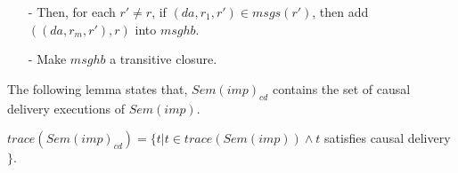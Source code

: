 \begin {itemize}
\begin{itemize}
\begin{itemize}
        \item[-] Then, for each $r' \neq r$, if $(\mathit{da},r_1,r') \in \mathit{msgs}(r')$, then add $((\mathit{da},r_m,r'),r)$ into $\mathit{msghb}$.

        \item[-] Make $\mathit{msghb}$ a transitive closure.
        \end{itemize}
    \end{itemize}
\end{itemize}

The following lemma states that, $\mathit{Sem}(\mathit{imp})_{\mathit{cd}}$ contains the set of causal delivery executions of $\mathit{Sem}(\mathit{imp})$.

\begin{lemma}
\label{lemma:semantics of imp cd contains the set of causal delivery executions of semantics of imp}
$\mathit{trace}( \mathit{Sem}(\mathit{imp})_{\mathit{cd}} ) = \{ t \vert t \in \mathit{trace}( \mathit{Sem}(\mathit{imp}) ) \wedge t$ satisfies causal delivery $\}$.
\end{lemma}

